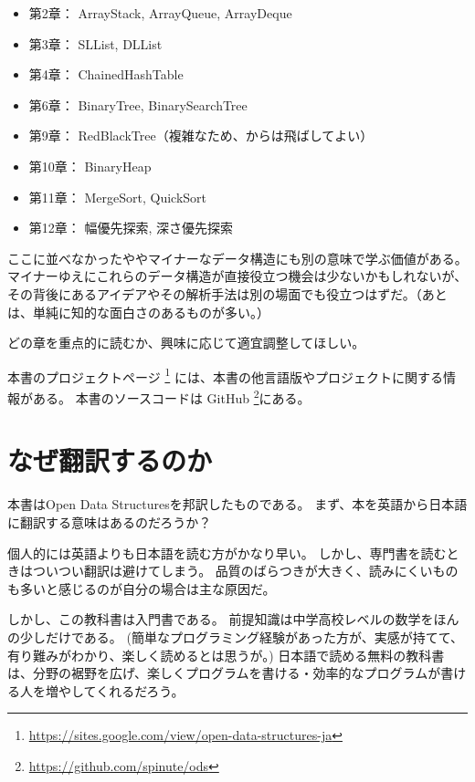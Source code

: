 \begin{itemize}
  \item 第2章： ArrayStack, ArrayQueue, ArrayDeque
  \item 第3章： SLList, DLList
  \item 第4章： ChainedHashTable
  \item 第6章： BinaryTree, BinarySearchTree
  \item 第9章： RedBlackTree（複雑なため、からは飛ばしてよい）
  \item 第10章： BinaryHeap
  \item 第11章： MergeSort, QuickSort
  \item 第12章： 幅優先探索, 深さ優先探索
\end{itemize}

ここに並べなかったややマイナーなデータ構造にも別の意味で学ぶ価値がある。
マイナーゆえにこれらのデータ構造が直接役立つ機会は少ないかもしれないが、その背後にあるアイデアやその解析手法は別の場面でも役立つはずだ。（あとは、単純に知的な面白さのあるものが多い。）

どの章を重点的に読むか、興味に応じて適宜調整してほしい。

本書のプロジェクトページ \footnote {\url{https://sites.google.com/view/open-data-structures-ja}} には、本書の他言語版やプロジェクトに関する情報がある。
本書のソースコードは GitHub \footnote {\url{https://github.com/spinute/ods}}にある。


\chapter*{なぜ翻訳するのか}
本書はOpen Data Structuresを邦訳したものである。
まず、本を英語から日本語に翻訳する意味はあるのだろうか？

個人的には英語よりも日本語を読む方がかなり早い。
しかし、専門書を読むときはついつい翻訳は避けてしまう。
品質のばらつきが大きく、読みにくいものも多いと感じるのが自分の場合は主な原因だ。

しかし、この教科書は入門書である。
前提知識は中学高校レベルの数学をほんの少しだけである。
(簡単なプログラミング経験があった方が、実感が持てて、有り難みがわかり、楽しく読めるとは思うが。)
日本語で読める無料の教科書は、分野の裾野を広げ、楽しくプログラムを書ける・効率的なプログラムが書ける人を増やしてくれるだろう。

